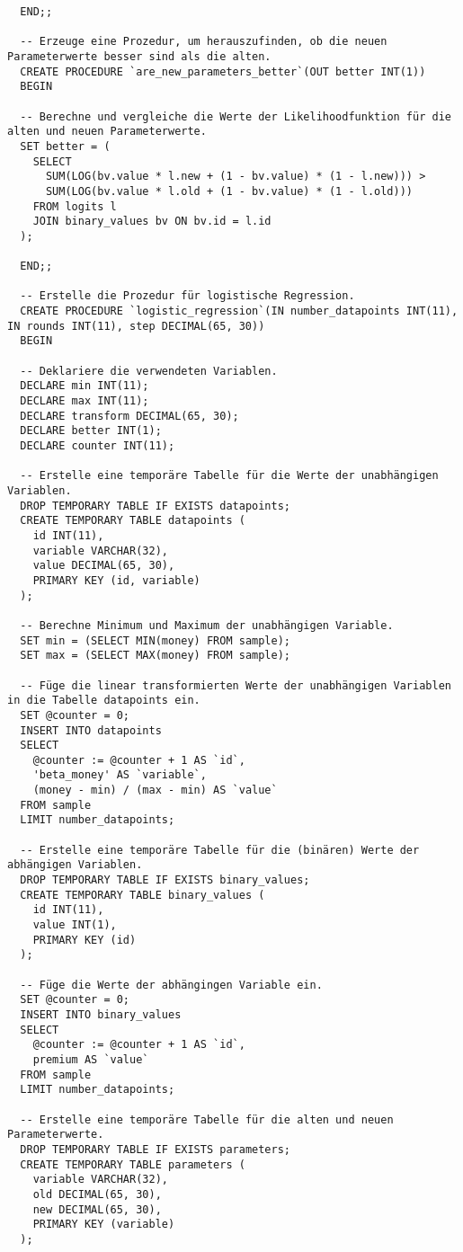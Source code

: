 \begin{verbatim}
  END;;

  -- Erzeuge eine Prozedur, um herauszufinden, ob die neuen Parameterwerte besser sind als die alten.
  CREATE PROCEDURE `are_new_parameters_better`(OUT better INT(1))
  BEGIN

  -- Berechne und vergleiche die Werte der Likelihoodfunktion für die alten und neuen Parameterwerte.
  SET better = (
    SELECT
      SUM(LOG(bv.value * l.new + (1 - bv.value) * (1 - l.new))) >
      SUM(LOG(bv.value * l.old + (1 - bv.value) * (1 - l.old)))
    FROM logits l
    JOIN binary_values bv ON bv.id = l.id
  );

  END;;

  -- Erstelle die Prozedur für logistische Regression.
  CREATE PROCEDURE `logistic_regression`(IN number_datapoints INT(11), IN rounds INT(11), step DECIMAL(65, 30))
  BEGIN

  -- Deklariere die verwendeten Variablen.
  DECLARE min INT(11);
  DECLARE max INT(11);
  DECLARE transform DECIMAL(65, 30);
  DECLARE better INT(1);
  DECLARE counter INT(11);

  -- Erstelle eine temporäre Tabelle für die Werte der unabhängigen Variablen.
  DROP TEMPORARY TABLE IF EXISTS datapoints;
  CREATE TEMPORARY TABLE datapoints (
    id INT(11),
    variable VARCHAR(32),
    value DECIMAL(65, 30),
    PRIMARY KEY (id, variable)
  );

  -- Berechne Minimum und Maximum der unabhängigen Variable.
  SET min = (SELECT MIN(money) FROM sample);
  SET max = (SELECT MAX(money) FROM sample);

  -- Füge die linear transformierten Werte der unabhängigen Variablen in die Tabelle datapoints ein.
  SET @counter = 0;
  INSERT INTO datapoints
  SELECT
    @counter := @counter + 1 AS `id`,
    'beta_money' AS `variable`,
    (money - min) / (max - min) AS `value`
  FROM sample
  LIMIT number_datapoints;

  -- Erstelle eine temporäre Tabelle für die (binären) Werte der abhängigen Variablen.
  DROP TEMPORARY TABLE IF EXISTS binary_values;
  CREATE TEMPORARY TABLE binary_values (
    id INT(11),
    value INT(1),
    PRIMARY KEY (id)
  );

  -- Füge die Werte der abhängingen Variable ein.
  SET @counter = 0;
  INSERT INTO binary_values
  SELECT
    @counter := @counter + 1 AS `id`,
    premium AS `value`
  FROM sample
  LIMIT number_datapoints;

  -- Erstelle eine temporäre Tabelle für die alten und neuen Parameterwerte.
  DROP TEMPORARY TABLE IF EXISTS parameters;
  CREATE TEMPORARY TABLE parameters (
    variable VARCHAR(32),
    old DECIMAL(65, 30),
    new DECIMAL(65, 30),
    PRIMARY KEY (variable)
  );


\end{verbatim}

